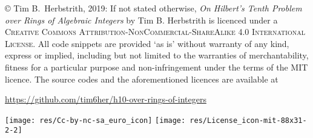 \newpage%
\thispagestyle{empty}%
\vspace*{\fill}%

\begin{footnotesize}%
\noindent%
© Tim B.\ Herbstrith, 2019: 
If not stated otherwise, \emph{On Hilbert's Tenth Problem over Rings
of Algebraic Integers} by Tim B. Herbstrith is licenced under a \textsc{Creative
Commons Attribution-NonCommercial-ShareAlike 4.0 International License}. All
code snippets are provided `as is' without warranty of any kind, express or
implied, including but not limited to the warranties of merchantability, fitness
for a particular purpose and non-infringement under the terms of the
\textsc{MIT} licence. The source codes and the aforementioned licences are
available at
\begin{center}
 \url{https://github.com/tim6her/h10-over-rings-of-integers}
\end{center}
\hspace{\fill}
\texttt{[image: res/Cc-by-nc-sa\_euro\_icon]}
\texttt{[image: res/License\_icon-mit-88x31-2-2]}
\end{footnotesize}
\cleardoublepage

\tableofcontents
